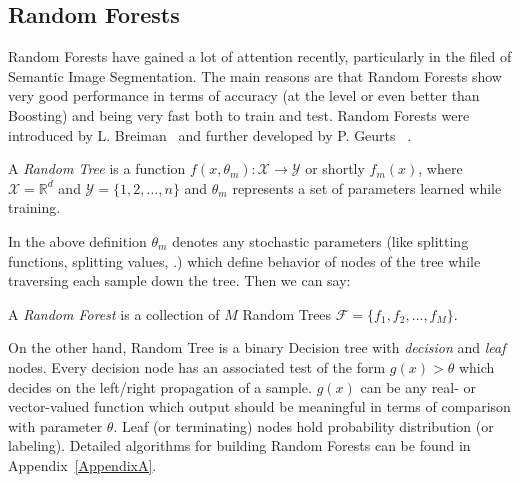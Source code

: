 \subsection{Random Forests}
\label{subsec:random_forests}
Random Forests have gained a lot of attention recently, particularly in the
filed of Semantic Image Segmentation. The main reasons are that Random Forests show
very good performance in terms of accuracy (at the level or even better than
Boosting) and being very fast both to train and test. Random Forests were
introduced by L. Breiman~\cite{Breiman2001} and further developed by P. Geurts
\etal~\cite{Geurts2006}.
\begin{definition}
 A \emph{Random Tree} is a function $ f(x, \theta_m) \colon \mathcal{X}
\to \mathcal{Y} $ or shortly $ f_m(x) $, where $ \mathcal{X} = \mathbb{R}^d
$ and $ \mathcal{Y} = \lbrace 1, 2,\dotsc, n \rbrace$ and $ \theta_m $
represents a set of parameters learned while training.
\end{definition}
In the above definition $ \theta_m $ denotes any
stochastic parameters (like splitting functions, splitting values, \etc.) which
define behavior of nodes of the tree while traversing each sample down the tree.
Then we can say:

\begin{definition}
 A \emph{Random Forest} is a collection of $ M $ Random Trees $ \mathcal{F} = \lbrace
f_1, f_2,\dotsc, f_M \rbrace $.
\end{definition}

On the other hand, Random Tree is a binary Decision tree with \emph{decision} and \emph{leaf}
nodes. Every decision node has an associated test of the form $ g(x) > \theta $
which decides on the left/right propagation of a sample. $ g(x) $ can be any
real- or vector-valued function which output should be meaningful in terms of
comparison with parameter $ \theta $. Leaf (or terminating) nodes hold
probability distribution (or labeling). Detailed algorithms for building Random Forests can be found in Appendix~\ref{AppendixA}.

